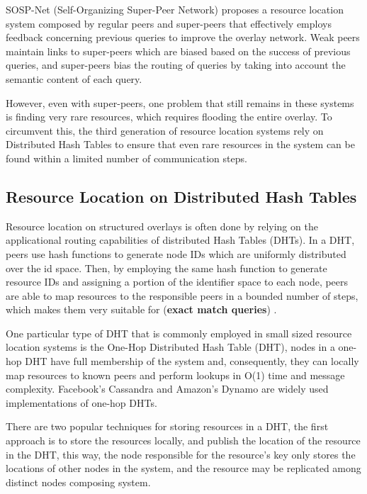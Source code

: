 SOSP-Net \cite{garbacki2007optimizing}  (Self-Organizing Super-Peer Network) proposes a resource location system composed by regular peers and super-peers that effectively employs feedback concerning previous queries to improve the overlay network. Weak peers maintain links to super-peers which are biased based on the success of previous queries, and super-peers bias the routing of queries by taking into account the semantic content of each query. 

However, even with super-peers, one problem that still remains in these systems is finding very rare resources, which requires flooding the entire overlay. To circumvent this, the third generation of resource location systems rely on Distributed Hash Tables to ensure that even rare resources in the system can be found within a limited number of communication steps.

\subsection{Resource Location on Distributed Hash Tables}

Resource location on structured overlays is often done by relying on the applicational routing capabilities of distributed Hash Tables (DHTs). In a DHT, peers use hash functions to generate node IDs which are uniformly distributed over the id space. Then, by employing the same hash function to generate resource IDs and assigning a portion of the identifier space to each node, peers are able to map resources to the responsible peers in a bounded number of steps, which makes them very suitable for (\textbf{exact match queries}) \cite{leitaoPHDthesis}. 

One particular type of DHT that is commonly employed in small sized resource location systems is the One-Hop Distributed Hash Table (DHT), nodes in a one-hop DHT have full membership of the system and, consequently, they can locally map resources to known peers and perform lookups in O(1) time and message complexity. Facebook's Cassandra \cite{lakshman2010cassandra} and Amazon's Dynamo \cite{decandia2007dynamo} are widely used implementations of one-hop DHTs. 

There are two popular techniques for storing resources in a DHT, the first approach is to store the resources locally, and publish the location of the resource in the DHT, this way, the node responsible for the resource's key only stores the locations of other nodes in the system, and the resource may be replicated among distinct nodes composing system. 

